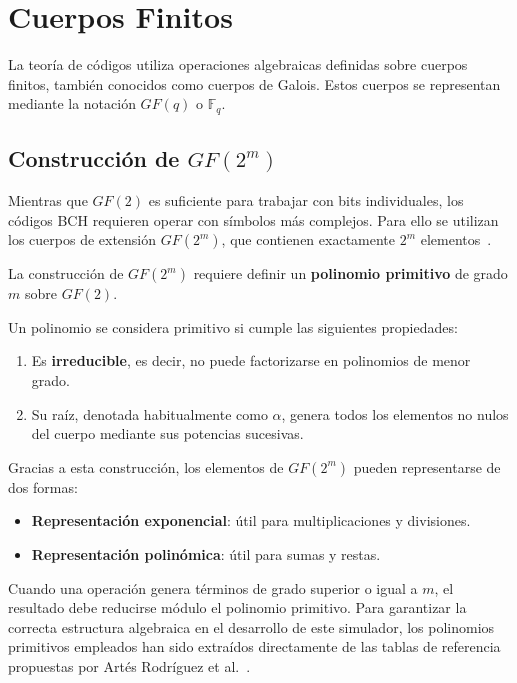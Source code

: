 \section{Cuerpos Finitos}
\label{sec:cuerpos_galois}

La teoría de códigos utiliza operaciones algebraicas definidas sobre cuerpos finitos, también conocidos como cuerpos de Galois. Estos cuerpos se representan mediante la notación $GF(q)$ o $\mathbb{F}_q$.


\subsection{Construcción de $GF(2^m)$}
\label{subsec:polinomio_primitivo}

Mientras que $GF(2)$ es suficiente para trabajar con bits individuales, los códigos BCH requieren operar con símbolos más complejos. Para ello se utilizan los cuerpos de extensión $GF(2^m)$, que contienen exactamente $2^m$ elementos~\cite{lin2004error}.

La construcción de $GF(2^m)$ requiere definir un \textbf{polinomio primitivo} de grado $m$ sobre $GF(2)$.

Un polinomio se considera primitivo si cumple las siguientes propiedades:

\begin{enumerate}
    \item Es \textbf{irreducible}, es decir, no puede factorizarse en polinomios de menor grado.
    
    \item Su raíz, denotada habitualmente como $\alpha$, genera todos los elementos no nulos del cuerpo mediante sus potencias sucesivas.
\end{enumerate}

Gracias a esta construcción, los elementos de $GF(2^m)$ pueden representarse de dos formas:

\begin{itemize}
    \item \textbf{Representación exponencial}: útil para multiplicaciones y divisiones.
    \item \textbf{Representación polinómica}: útil para sumas y restas.
\end{itemize}

Cuando una operación genera términos de grado superior o igual a $m$, el resultado debe reducirse módulo el polinomio primitivo. Para garantizar la correcta estructura algebraica en el desarrollo de este simulador, los polinomios primitivos empleados han sido extraídos directamente de las tablas de referencia propuestas por Artés Rodríguez et al.~\cite{artes2012comunicaciones}.

